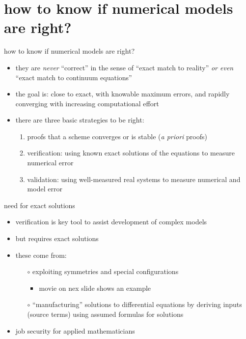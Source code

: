 \documentclass[10pt,hyperref={pdfpagelabels=true}]{beamer}
\begin{document}
\section[on being right]{how to know if numerical models are right?}

\begin{frame}{how to know if numerical models are right?}

\begin{itemize}
\item they are \emph{never} ``correct'' in the sense of ``exact match to reality'' \emph{or even} ``exact match to continuum equations''
\item the \alert{goal} is: \alert{close to exact, with knowable maximum errors, and rapidly converging with increasing computational effort}

\bigskip
\item<2> there are three basic strategies to be right:
    \begin{enumerate}
    \item proofs that a scheme converges or is stable (\emph{a priori} proofs)
    \item \alert{verification}: using known exact solutions of the equations to measure numerical error
    \item \alert{validation}: using well-measured real systems to measure numerical and model error
    \end{enumerate}
\end{itemize}
\end{frame}


\begin{frame}{need for exact solutions}

\begin{itemize}
\item verification is key tool to assist development of complex models
\item \alert{but requires exact solutions}
\item these come from:
    \begin{itemize}
    \item[$\circ$] exploiting symmetries and special configurations
        \begin{itemize}
        \item \alert{movie on nex slide} shows an example
        \end{itemize}
    \item[$\circ$] ``manufacturing'' solutions to differential equations by deriving inputs (source terms) using assumed formulas for solutions
    \end{itemize}
\item job security for applied mathematicians
\end{itemize}
\end{frame}
\end{document}
